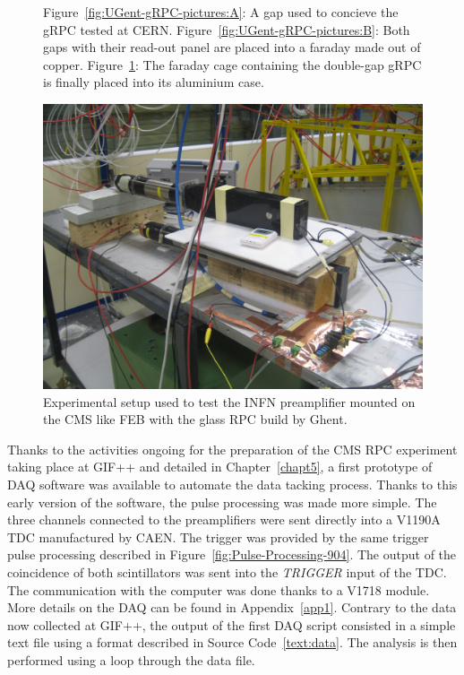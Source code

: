 \begin{figure}[H]
\begin{subfigure}{\linewidth}
			\caption{\label{fig:UGent-gRPC-pictures:C}}
		\end{subfigure}
		\caption{\label{fig:UGent-gRPC-pictures} Figure~\ref{fig:UGent-gRPC-pictures:A}: A gap used to concieve the gRPC tested at CERN. Figure~\ref{fig:UGent-gRPC-pictures:B}: Both gaps with their read-out panel are placed into a faraday made out of copper. Figure~\ref{fig:UGent-gRPC-pictures:C}: The faraday cage containing the double-gap gRPC is finally placed into its aluminium case.}
    \end{figure}

	\begin{figure}[H]
		\centering
		\includegraphics[width=.6\linewidth]{fig/chapt6/Setup_ATLAS_gRPC.JPG}
		\caption{\label{fig:Setup-INFN-gRPC} Experimental setup used to test the INFN preamplifier mounted on the CMS like FEB with the glass RPC build by Ghent.}
	\end{figure}
    
    Thanks to the activities ongoing for the preparation of the CMS RPC experiment taking place at GIF++ and detailed in Chapter~\ref{chapt5}, a first prototype of DAQ software was available to automate the data tacking process. Thanks to this early version of the software, the pulse processing was made more simple. The three channels connected to the preamplifiers were sent directly into a V1190A TDC manufactured by CAEN. The trigger was provided by the same trigger pulse processing described in Figure~\ref{fig:Pulse-Processing-904}. The output of the coincidence of both scintillators was sent into the \textit{TRIGGER} input of the TDC. The communication with the computer was done thanks to a V1718 module. More details on the DAQ can be found in Appendix~\ref{app1}. Contrary to the data now collected at GIF++, the output of the first DAQ script consisted in a simple text file using a format described in Source Code~\ref{text:data}. The analysis is then performed using a loop through the data file.
    
